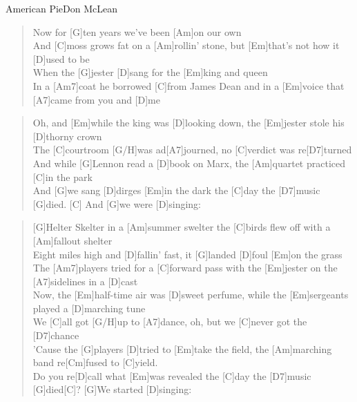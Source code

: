 \begin{song}{American Pie}{Don McLean}

    \begin{verse}  
        Now for [G]ten years we've been [Am]on our own \\
        And [C]moss grows fat on a [Am]rollin' stone, but [Em]that's not how it [D]used to be \\
        When the [G]jester [D]sang for the [Em]king and queen \\
        In a [Am7]coat he borrowed [C]from James Dean and in  a [Em]voice that [A7]came from you and [D]me
    \end{verse}  


    \begin{verse}
        Oh, and [Em]while the king was [D]looking down, the [Em]jester stole his [D]thorny crown \\
        The [C]courtroom [G/H]was ad[A7]journed, no [C]verdict was re[D7]turned \\
        And while [G]Lennon read a [D]book on Marx, the [Am]quartet practiced [C]in the park \\
        And [G]we sang [D]dirges [Em]in the dark the [C]day the [D7]music [G]died. [C] \hspace{1em} And [G]we were [D]singing:
    \end{verse}


    \begin{verse}
        [G]Helter Skelter in a [Am]summer swelter the [C]birds flew off with a [Am]fallout shelter
        \\
        [Em]Eight miles high and [D]fallin' fast, it [G]landed [D]foul [Em]on the grass \\
        The [Am7]players tried for a [C]forward pass with the [Em]jester on the [A7]sidelines in a [D]cast \\

        Now, the [Em]half-time air was [D]sweet perfume, while the [Em]sergeants played a [D]marching tune \\
        We [C]all got [G/H]up to [A7]dance, oh, but we [C]never got the [D7]chance \\
        'Cause the [G]players [D]tried to [Em]take the field, the [Am]marching band re[Cm]fused to [C]yield. \\
        [G]Do you re[D]call what [Em]was revealed the [C]day the [D7]music [G]died[C]? \hspace{1em} [G]We started [D]singing:
    \end{verse}


\end{song}
